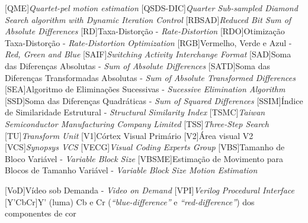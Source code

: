 \begin{acronym}
[QME]{\textit{Quartet-pel motion estimation}}
[QSDS-DIC]{\textit{Quarter Sub-sampled Diamond Search algorithm with Dynamic Iteration Control}}
[RBSAD]{\textit{Reduced Bit Sum of Absolute Differences}}
[RD]{Taxa-Distorção - \textit{Rate-Distortion}}
[RDO]{Otimização Taxa-Distorção - \textit{Rate-Distortion Optimization}}
[RGB]{Vermelho, Verde e Azul - \textit{Red, Green and Blue}}
[SAIF]{\textit{Switching Activity Interchange Format}}
[SAD]{Soma das Diferenças Absolutas - \textit{Sum of Absolute Differences}}
[SATD]{Soma das Diferenças Transformadas Absolutas - \textit{Sum of Absolute Transformed Differences}}
[SEA]{Algoritmo de Eliminações Sucessivas - \textit{Sucessive Elimination Algorithm}}
[SSD]{Soma das Diferenças Quadráticas - \textit{Sum of Squared Differences}}
[SSIM]{Índice de Similaridade Estrutural - \textit{Structural Similarity Index}}
[TSMC]{\textit{Taiwan Semiconductor Manufacturing Company Limited}}
[TSS]{\textit{Three-Step Search}}
[TU]{\textit{Transform Unit}}
[V1]{Córtex Visual Primário}
[V2]{Área visual V2}
[VCS]{\textit{Synopsys VCS}}
[VECG]{\textit{Visual Coding Experts Group}}
[VBS]{Tamanho de Bloco Variável - \textit{Variable Block Size}}
[VBSME]{Estimação de Movimento para Blocos de Tamanho Variável - \textit{Variable Block Size Motion Estimation}}

[VoD]{Vídeo sob Demanda - \textit{Video on Demand}}
[VPI]{\textit{Verilog Procedural Interface}}
[Y'CbCr]{Y' (luma) Cb e Cr (\textit{``blue-difference''} e \textit{``red-difference''}) dos componentes de cor}


\renewcommand{\baselinestretch}{1}%
\large\normalsize%

\end{acronym}
